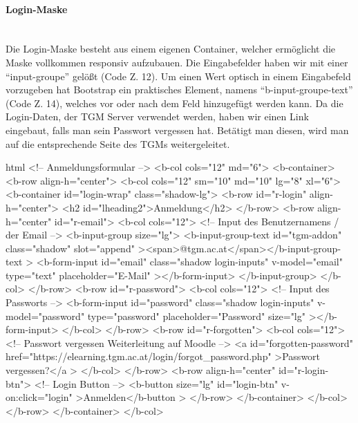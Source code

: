 \paragraph{Login-Maske}
~\\
Die Login-Maske besteht aus einem eigenen Container, welcher ermöglicht die Maske vollkommen responsiv aufzubauen. Die Eingabefelder haben wir mit einer \enquote{input-groupe} gelößt (Code Z. 12). Um einen Wert optisch in einem Eingabefeld vorzugeben hat Bootstrap ein praktisches Element, namens \enquote{b-input-groupe-text} (Code Z. 14), welches vor oder nach dem Feld hinzugefügt werden kann. Da die Login-Daten, der TGM Server verwendet werden, haben wir einen Link eingebaut, falls man sein Passwort vergessen hat. Betätigt man diesen, wird man auf die entsprechende Seite des TGMs weitergeleitet.
\begin{code}{html}
	<!-- Anmeldungsformular -->
	<b-col cols="12" md="6">
		<b-container>
			<b-row align-h="center">
				<b-col cols="12" sm="10" md="10" lg="8" xl="6">
					<b-container id="login-wrap" class="shadow-lg">
						<b-row id="r-login" align-h="center">
							<h2 id="lheading2">Anmeldung</h2>
						</b-row>
						<b-row align-h="center" id="r-email">
							<b-col cols="12">
								<!-- Input des Benutzernamens / der Email -->
								<b-input-group size="lg">
									<b-input-group-text
										id="tgm-addon"
										class="shadow"
										slot="append"
										><span>@tgm.ac.at</span></b-input-group-text
										>
									<b-form-input
										id="email"
										class="shadow login-inputs"
										v-model="email"
										type="text"
										placeholder="E-Mail"
									></b-form-input>
								</b-input-group>
							</b-col>
						</b-row>
						<b-row id="r-password">
							<b-col cols="12">
								<!-- Input des Passworts -->
								<b-form-input
									id="password"
									class="shadow login-inputs"
									v-model="password"
									type="password"
									placeholder="Password"
									size="lg"
								></b-form-input>
							</b-col>
						</b-row>
						<b-row id="r-forgotten">
							<b-col cols="12">
								<!-- Passwort vergessen Weiterleitung auf Moodle -->
								<a
									id="forgotten-password"
									href="https://elearning.tgm.ac.at/login/forgot_password.php"
								>Passwort vergessen?</a
								>
							</b-col>
						</b-row>
						<b-row align-h="center" id="r-login-btn">
							<!-- Login Button -->
							<b-button size="lg" id="login-btn" v-on:click="login"
							>Anmelden</b-button
							>
						</b-row>
					</b-container>
				</b-col>
			</b-row>
		</b-container>
	</b-col>
\end{code}
